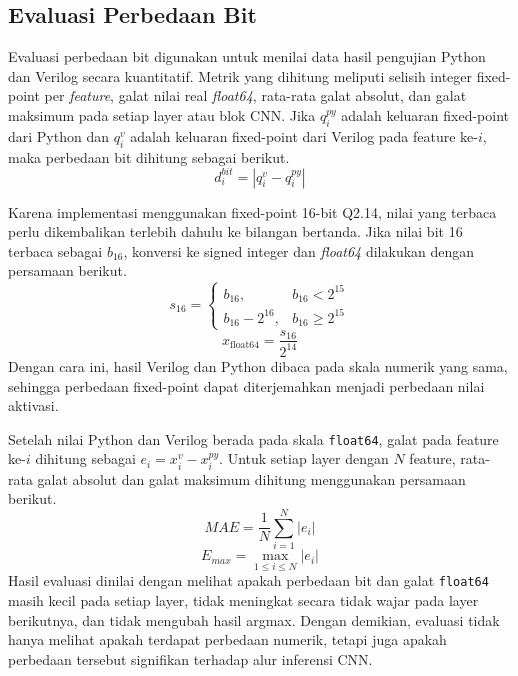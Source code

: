 	\subsection{Evaluasi Perbedaan Bit}
	Evaluasi perbedaan bit digunakan untuk menilai data hasil pengujian Python
	dan Verilog secara kuantitatif. Metrik yang dihitung meliputi selisih
	integer fixed-point per \emph{feature}, galat nilai real \emph{float64},
	rata-rata galat absolut, dan galat maksimum pada setiap layer atau blok CNN.
	Jika $q_i^{py}$ adalah keluaran fixed-point dari Python dan $q_i^{v}$ adalah
	keluaran fixed-point dari Verilog pada feature ke-$i$, maka perbedaan bit
	dihitung sebagai berikut.
	\begin{equation}
		d_i^{bit} = \left| q_i^{v} - q_i^{py} \right|
	\end{equation}

	Karena implementasi menggunakan fixed-point 16-bit Q2.14, nilai yang terbaca
	perlu dikembalikan terlebih dahulu ke bilangan bertanda. Jika nilai bit 16
	terbaca sebagai $b_{16}$, konversi ke signed integer dan \emph{float64}
	dilakukan dengan persamaan berikut.
	\begin{equation}
		s_{16} =
		\begin{cases}
			b_{16}, & b_{16} < 2^{15} \\
			b_{16} - 2^{16}, & b_{16} \geq 2^{15}
		\end{cases}
	\end{equation}
	\begin{equation}
		x_{\mathrm{float64}} = \frac{s_{16}}{2^{14}}
	\end{equation}
	Dengan cara ini, hasil Verilog dan Python dibaca pada skala numerik yang sama,
	sehingga perbedaan fixed-point dapat diterjemahkan menjadi perbedaan nilai
	aktivasi.

	Setelah nilai Python dan Verilog berada pada skala \texttt{float64}, galat
	pada feature ke-$i$ dihitung sebagai $e_i = x_i^{v} - x_i^{py}$. Untuk setiap
	layer dengan $N$ feature, rata-rata galat absolut dan galat maksimum dihitung
	menggunakan persamaan berikut.
	\begin{equation}
		MAE = \frac{1}{N}\sum_{i=1}^{N}\left| e_i \right|
	\end{equation}
	\begin{equation}
		E_{max} = \max_{1 \leq i \leq N}\left| e_i \right|
	\end{equation}
	Hasil evaluasi dinilai dengan melihat apakah perbedaan bit dan galat
	\texttt{float64} masih kecil pada setiap layer, tidak meningkat secara tidak
	wajar pada layer berikutnya, dan tidak mengubah hasil argmax. Dengan demikian,
	evaluasi tidak hanya melihat apakah terdapat perbedaan numerik, tetapi juga
	apakah perbedaan tersebut signifikan terhadap alur inferensi CNN.

